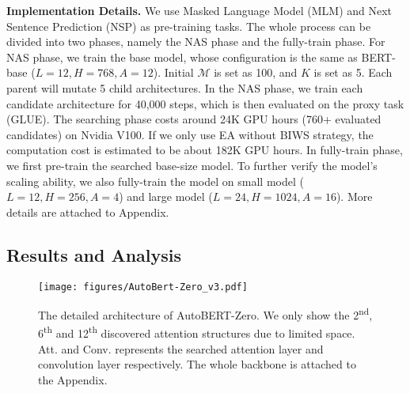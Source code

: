 \documentclass[letterpaper]{article} \usepackage{aaai22}  \usepackage{times}  \usepackage{helvet}  \usepackage{courier}  \usepackage[hyphens]{url}  \usepackage{graphicx} \urlstyle{rm} \def\UrlFont{\rm}  \usepackage{natbib}  \usepackage{caption} \DeclareCaptionStyle{ruled}{labelfont=normalfont,labelsep=colon,strut=off} \frenchspacing  \setlength{\pdfpagewidth}{8.5in}  \setlength{\pdfpageheight}{11in}  \usepackage{algorithm}
\begin{document}
\textbf{Implementation Details.} 
We use Masked Language Model (MLM) and Next Sentence Prediction (NSP) as pre-training tasks.
The whole process can be divided into two phases, namely the NAS phase and the fully-train phase. For NAS phase, we train the base model, whose configuration is the same as BERT-base ($L=12,H=768,A=12$).
Initial {$\mathcal{M}$} is set as 100, and $K$ is set as 5.
Each parent will mutate 5 child architectures. In the NAS phase, we train each candidate architecture for 40,000 steps, which is then evaluated on the proxy task (GLUE).
The searching phase costs around 24K GPU hours (760+ evaluated candidates) on Nvidia V100. If we only use EA without BIWS strategy, the computation cost is estimated to be about 182K GPU hours. 
In fully-train phase, we first pre-train the searched base-size model. To further verify the model’s scaling ability, we also fully-train the model on small model ($L=12,H=256,A=4$) and large model ($L=24,H=1024,A=16$).
More details are attached to Appendix. 

\subsection{Results and Analysis}\label{sec:analysis}
\begin{figure}[t]
\centering
 	\vspace{-5mm}
	\texttt{[image: figures/AutoBert-Zero\_v3.pdf]}
	\vspace{-6mm}
	\caption{The detailed architecture of AutoBERT-Zero. We only show the 2\textsuperscript{nd}, 6\textsuperscript{th} and 12\textsuperscript{th} discovered attention structures due to limited space. Att. and Conv. represents the searched attention layer and convolution layer respectively. The whole backbone is attached to the Appendix.
	}
	\label{fig:autobert-zero}
\vspace{-5mm}
\end{figure}
\end{document}
